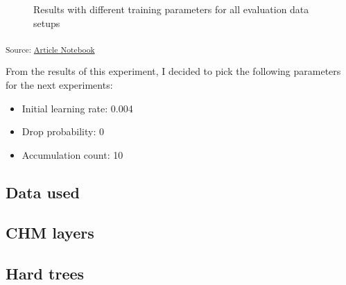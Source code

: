 \documentclass[
  letterpaper,
  DIV=11,
  numbers=noendperiod]{scrartcl}
\providecommand{\tightlist}{%
  \setlength{\itemsep}{0pt}\setlength{\parskip}{0pt}}\usepackage{longtable,booktabs,array}
\begin{document}
\begin{figure}[H]


\caption{\label{fig-training-parameters-data}Results with different
training parameters for all evaluation data setups}

\end{figure}%

\textsubscript{Source:
\href{https://ZokszY.github.io/Geodan-internship-report/index.qmd.html}{Article
Notebook}}

From the results of this experiment, I decided to pick the following
parameters for the next experiments:

\begin{itemize}
\tightlist
\item
  Initial learning rate: 0.004
\item
  Drop probability: 0
\item
  Accumulation count: 10
\end{itemize}

\subsection{Data used}\label{data-used}

\subsection{CHM layers}\label{chm-layers}

\subsection{Hard trees}\label{hard-trees}
\end{document}
